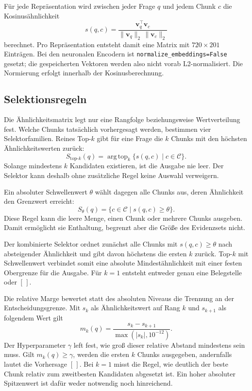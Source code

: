 \documentclass[11pt]{article}
\begin{document}
Für jede Repräsentation wird zwischen jeder Frage $q$ und jedem Chunk $c$ die Kosinusähnlichkeit
\begin{equation}
s(q,c)=\frac{\mathbf{v}_q^\top\mathbf{v}_c}
{\lVert\mathbf{v}_q\rVert_2\,\lVert\mathbf{v}_c\rVert_2}
\end{equation}
berechnet. Pro Repräsentation entsteht damit eine Matrix mit $720\times201$ Einträgen. Bei den neuronalen Encodern ist \texttt{normalize\_embeddings=False} gesetzt; die gespeicherten Vektoren werden also nicht vorab L2-normalisiert. Die Normierung erfolgt innerhalb der Kosinusberechnung.

\subsection{Selektionsregeln}

Die Ähnlichkeitsmatrix legt nur eine Rangfolge beziehungsweise Wertverteilung fest. Welche Chunks tatsächlich vorhergesagt werden, bestimmen vier Selektorfamilien. Reines Top-$k$ gibt für eine Frage die $k$ Chunks mit den höchsten Ähnlichkeitswerten zurück:
\begin{equation}
S_{\mathrm{top}\text{-}k}(q)=\operatorname{arg\,top}_{k}
\{s(q,c)\mid c\in\mathcal{C}\}.
\end{equation}
Solange mindestens $k$ Kandidaten existieren, ist die Ausgabe nie leer. Der Selektor kann deshalb ohne zusätzliche Regel keine Auswahl verweigern.

Ein absoluter Schwellenwert $\theta$ wählt dagegen alle Chunks aus, deren Ähnlichkeit den Grenzwert erreicht:
\begin{equation}
S_{\theta}(q)=\{c\in\mathcal{C}\mid s(q,c)\geq\theta\}.
\end{equation}
Diese Regel kann die leere Menge, einen Chunk oder mehrere Chunks ausgeben. Damit ermöglicht sie Enthaltung, begrenzt aber die Größe des Evidenzsets nicht.

Der kombinierte Selektor ordnet zunächst alle Chunks mit $s(q,c)\geq\theta$ nach absteigender Ähnlichkeit und gibt davon höchstens die ersten $k$ zurück. Top-$k$ mit Schwellenwert verbindet somit eine absolute Mindestähnlichkeit mit einer festen Obergrenze für die Ausgabe. Für $k=1$ entsteht entweder genau eine Belegstelle oder $[\,]$.

Die relative Marge bewertet statt des absoluten Niveaus die Trennung an der Entscheidungsgrenze. Mit $s_k$ als Ähnlichkeitswert auf Rang $k$ und $s_{k+1}$ als folgendem Wert gilt
\begin{equation}
m_k(q)=\frac{s_k-s_{k+1}}{\max(|s_k|,10^{-12})}.
\end{equation}
Der Hyperparameter $\gamma$ left fest, wie groß dieser relative Abstand mindestens sein muss. Gilt $m_k(q)\geq\gamma$, werden die ersten $k$ Chunks ausgegeben, andernfalls lautet die Vorhersage $[\,]$. Bei $k=1$ misst die Regel, wie deutlich der beste Chunk relativ zum zweitbesten Kandidaten abgesetzt ist. Ein hoher absoluter Spitzenwert ist dafür weder notwendig noch hinreichend.
\end{document}
